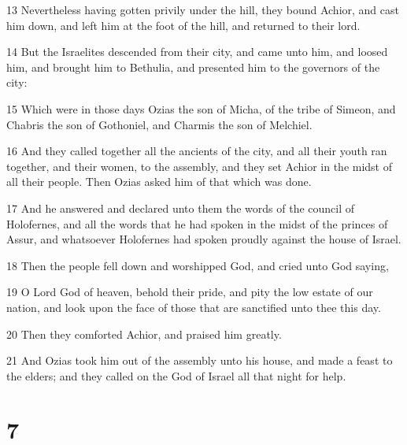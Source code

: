 \par 13 Nevertheless having gotten privily under the hill, they bound Achior, and cast him down, and left him at the foot of the hill, and returned to their lord.
\par 14 But the Israelites descended from their city, and came unto him, and loosed him, and brought him to Bethulia, and presented him to the governors of the city:
\par 15 Which were in those days Ozias the son of Micha, of the tribe of Simeon, and Chabris the son of Gothoniel, and Charmis the son of Melchiel.
\par 16 And they called together all the ancients of the city, and all their youth ran together, and their women, to the assembly, and they set Achior in the midst of all their people. Then Ozias asked him of that which was done.
\par 17 And he answered and declared unto them the words of the council of Holofernes, and all the words that he had spoken in the midst of the princes of Assur, and whatsoever Holofernes had spoken proudly against the house of Israel.
\par 18 Then the people fell down and worshipped God, and cried unto God saying,
\par 19 O Lord God of heaven, behold their pride, and pity the low estate of our nation, and look upon the face of those that are sanctified unto thee this day.
\par 20 Then they comforted Achior, and praised him greatly.
\par 21 And Ozias took him out of the assembly unto his house, and made a feast to the elders; and they called on the God of Israel all that night for help.

\chapter{7}

